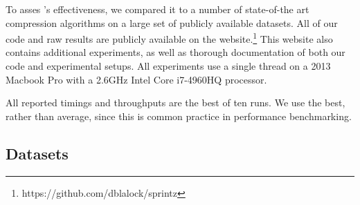 

To asses \mine's effectiveness, we compared it to a number of state-of-the art compression algorithms on a large set of publicly available datasets. All of our code and raw results are publicly available on the \minesp website.\footnote{https://github.com/dblalock/sprintz} This website also contains additional experiments, as well as thorough documentation of both our code and experimental setups. All experiments use a single thread on a 2013 Macbook Pro with a 2.6GHz Intel Core i7-4960HQ processor.

All reported timings and throughputs are the best of ten runs. We use the best, rather than average, since this is common practice in performance benchmarking.

\vspace{1mm}
\subsection{Datasets}
\vspace{-1mm}

